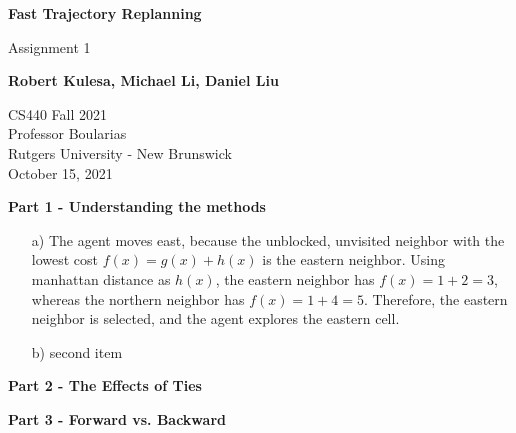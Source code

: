 \documentclass[11pt]{article}
\begin{document}
    \begin{titlepage}
        \begin{center}
            \vspace*{1cm}

            \Huge
            \textbf{Fast Trajectory Replanning}

            \vspace{0.5cm}
            \LARGE
            Assignment 1

            \vspace{1cm}

            \textbf{Robert Kulesa, Michael Li, Daniel Liu}

            \vfill


            \vspace{0.8cm}

            \Large
            CS440 Fall 2021\\
            Professor Boularias\\
            Rutgers University - New Brunswick\\
            October 15, 2021

        \end{center}
    \end{titlepage}
    \begin{center}
        \Large
        \textbf{Part 1 - Understanding the methods}
    \end{center}
    \normalsize
    \begin{enumerate}
        \item[a)] The agent moves east, because the unblocked,
        unvisited neighbor with the lowest cost $f(x) = g(x) + h(x)$ is the eastern neighbor.
        Using manhattan distance as $h(x)$, the eastern neighbor has $f(x) = 1 + 2 = 3$,
        whereas the northern neighbor has $f(x) = 1 + 4 = 5$.
        Therefore, the eastern neighbor is selected, and the agent explores the eastern cell.
        \item[b)] second item
    \end{enumerate}
    
    
    \begin{center}
        \Large
        \textbf{Part 2 - The Effects of Ties}
    \end{center}
    
    \begin{center}
        \Large
        \textbf{Part 3 - Forward vs. Backward}
    \end{center}
    
\end{document}
